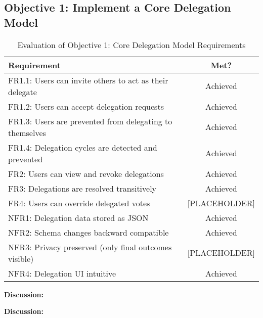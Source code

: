 \subsection{Objective 1: Implement a Core Delegation Model}

\begin{table}[H]
\centering
\begin{tabular}{|p{9cm}|c|}
\hline
\textbf{Requirement} & \textbf{Met?} \\ \hline
FR1.1: Users can invite others to act as their delegate & Achieved \\ \hline
FR1.2: Users can accept delegation requests & Achieved \\ \hline
FR1.3: Users are prevented from delegating to themselves & Achieved \\ \hline
FR1.4: Delegation cycles are detected and prevented & Achieved \\ \hline
FR2: Users can view and revoke delegations & Achieved \\ \hline
FR3: Delegations are resolved transitively & Achieved \\ \hline
FR4: Users can override delegated votes & [PLACEHOLDER] \\ \hline
NFR1: Delegation data stored as JSON & Achieved \\ \hline
NFR2: Schema changes backward compatible & Achieved \\ \hline
NFR3: Privacy preserved (only final outcomes visible) & [PLACEHOLDER] \\ \hline
NFR4: Delegation UI intuitive & Achieved \\ \hline
\end{tabular}
\caption{Evaluation of Objective 1: Core Delegation Model Requirements}
\label{tab:objective1_requirements}
\end{table}

\textbf{Discussion:}

\textbf{Discussion:}

